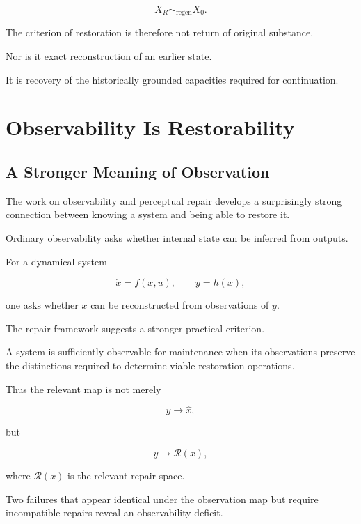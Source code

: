 \documentclass[11pt]{article}
\theoremstyle{remark}
\begin{document}
\begin{equation}
X_R\sim_{\mathrm{regen}}X_0.
\end{equation}

The criterion of restoration is therefore not return of original substance.

Nor is it exact reconstruction of an earlier state.

It is recovery of the historically grounded capacities required for continuation.

\section{Observability Is Restorability}

\subsection{A Stronger Meaning of Observation}

The work on observability and perceptual repair develops a surprisingly strong connection between knowing a system and being able to restore it.

Ordinary observability asks whether internal state can be inferred from outputs.

For a dynamical system

\begin{equation}
\dot{x}=f(x,u),
\qquad
y=h(x),
\end{equation}

one asks whether $x$ can be reconstructed from observations of $y$.

The repair framework suggests a stronger practical criterion.

A system is sufficiently observable for maintenance when its observations preserve the distinctions required to determine viable restoration operations.

Thus the relevant map is not merely

\begin{equation}
y\longrightarrow\hat{x},
\end{equation}

but

\begin{equation}
y
\longrightarrow
\mathcal{R}(x),
\end{equation}

where $\mathcal{R}(x)$ is the relevant repair space.

Two failures that appear identical under the observation map but require incompatible repairs reveal an observability deficit.
\end{document}
